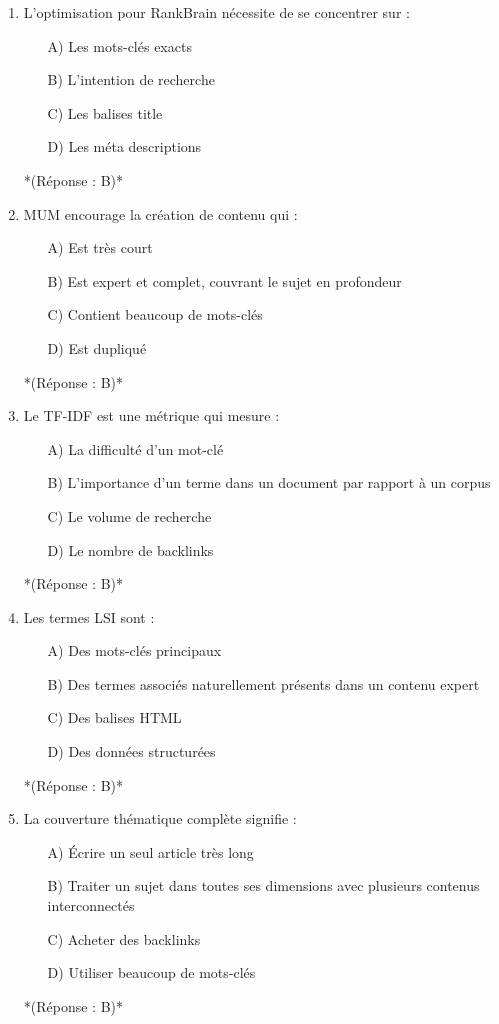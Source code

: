 \documentclass[12pt,a4paper,twoside]{report}
\begin{document}
\begin{enumerate}
\item L'optimisation pour RankBrain nécessite de se concentrer sur :
\begin{itemize}
\item[A)] Les mots-clés exacts
\item[B)] L'intention de recherche
\item[C)] Les balises title
\item[D)] Les méta descriptions
\end{itemize}
*(Réponse : B)*

\item MUM encourage la création de contenu qui :
\begin{itemize}
\item[A)] Est très court
\item[B)] Est expert et complet, couvrant le sujet en profondeur
\item[C)] Contient beaucoup de mots-clés
\item[D)] Est dupliqué
\end{itemize}
*(Réponse : B)*

\item Le TF-IDF est une métrique qui mesure :
\begin{itemize}
\item[A)] La difficulté d'un mot-clé
\item[B)] L'importance d'un terme dans un document par rapport à un corpus
\item[C)] Le volume de recherche
\item[D)] Le nombre de backlinks
\end{itemize}
*(Réponse : B)*

\item Les termes LSI sont :
\begin{itemize}
\item[A)] Des mots-clés principaux
\item[B)] Des termes associés naturellement présents dans un contenu expert
\item[C)] Des balises HTML
\item[D)] Des données structurées
\end{itemize}
*(Réponse : B)*

\item La couverture thématique complète signifie :
\begin{itemize}
\item[A)] Écrire un seul article très long
\item[B)] Traiter un sujet dans toutes ses dimensions avec plusieurs contenus interconnectés
\item[C)] Acheter des backlinks
\item[D)] Utiliser beaucoup de mots-clés
\end{itemize}
*(Réponse : B)*


\end{enumerate}
\end{document}
